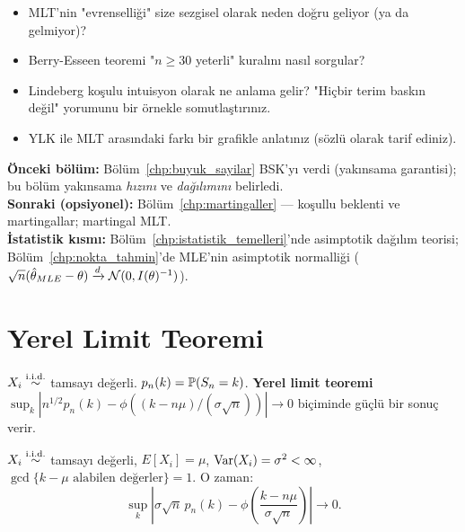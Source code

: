 \begin{ozyansima}
\begin{itemize}
  \item MLT'nin "evrenselliği" size sezgisel olarak neden doğru geliyor (ya da gelmiyor)?
  \item Berry-Esseen teoremi "$n \geq 30$ yeterli" kuralını nasıl sorgular?
  \item Lindeberg koşulu intuisyon olarak ne anlama gelir?
        "Hiçbir terim baskın değil" yorumunu bir örnekle somutlaştırınız.
  \item YLK ile MLT arasındaki farkı bir grafikle anlatınız (sözlü olarak tarif ediniz).
\end{itemize}
\end{ozyansima}

\begin{kopru}
\textbf{Önceki bölüm:} Bölüm~\ref{chp:buyuk_sayilar} BSK'yı verdi (yakınsama garantisi);
bu bölüm yakınsama \emph{hızını} ve \emph{dağılımını} belirledi.\\
\textbf{Sonraki (opsiyonel):} Bölüm~\ref{chp:martingaller} --- koşullu beklenti
ve martingallar; martingal MLT.\\
\textbf{İstatistik kısmı:} Bölüm~\ref{chp:istatistik_temelleri}'nde asimptotik
dağılım teorisi; Bölüm~\ref{chp:nokta_tahmin}'de MLE'nin asimptotik normalliği
($\sqrt{n}(\hat\theta_{MLE}-\theta) \xrightarrow{d} \mathcal{N}(0, I(\theta)^{-1})$).
\end{kopru}

\section{Yerel Limit Teoremi}
\label{sec:yerel_limit}

\begin{tanim}\label{def:yerel_limit}
$X_i\overset{\text{i.i.d.}}{\sim}$ tamsayı değerli. $p_n(k)=\mathbb{P}(S_n=k)$. \textbf{Yerel limit teoremi} $\sup_k|n^{1/2}p_n(k)-\phi((k-n\mu)/(\sigma\sqrt{n}))|\to0$ biçiminde güçlü bir sonuç verir.
\end{tanim}

\begin{teorem}\label{thm:yerel_mlt}
$X_i\overset{\text{i.i.d.}}{\sim}$ tamsayı değerli, $E[X_i]=\mu$, $\operatorname{Var}(X_i)=\sigma^2<\infty$, $\gcd\{k-\mu\text{ alabilen değerler}\}=1$. O zaman:
\[
  \sup_k\!\left|\sigma\sqrt{n}\,p_n(k) - \phi\!\left(\frac{k-n\mu}{\sigma\sqrt{n}}\right)\right| \to 0.
\]
\end{teorem}

